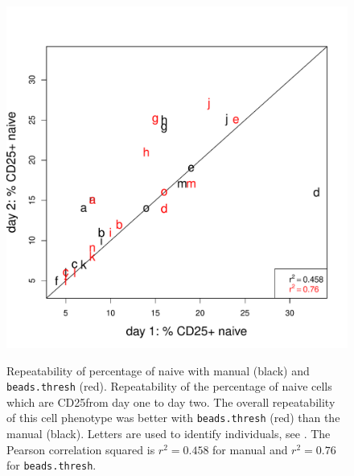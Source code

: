 
\begin{figure}
\centering
\begin{minipage}{.6\textwidth}
\includegraphics[width=\linewidth]{figures/repeatability-cd25pos-naive.pdf}
\end{minipage}
{ Repeatability of percentage of naive \positive with manual (black) and \texttt{beads.thresh} (red). }
{
Repeatability of the percentage of naive cells which are CD25\positive from day one to day two.
The overall repeatability of this cell phenotype was better with \texttt{beads.thresh} (red)
than the manual (black).
Letters are used to identify individuals, see .
The Pearson correlation squared is $r^2=0.458$ for manual and $r^2=0.76$ for \texttt{beads.thresh}.
}
\end{figure}


